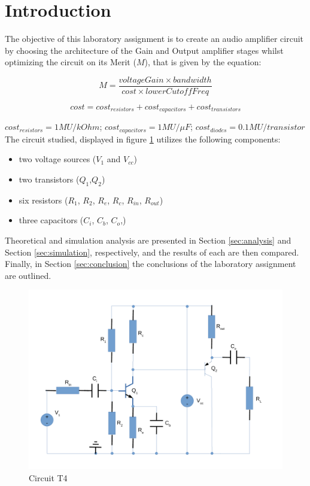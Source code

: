 
\section{Introduction}
\label{sec:introduction}



The objective of this laboratory assignment is to create an audio amplifier circuit by choosing the architecture of the Gain and Output amplifier stages whilst optimizing the circuit on its Merit ($M$), that is given by the equation:

\[
M = \frac{voltageGain\times bandwidth}{cost\times lowerCutoffFreq}
\]

\[
 cost = cost_{resistors} + cost_{capacitors} + cost_{transistors} 
\]

$cost_{resistors} = 1MU/kOhm$; $cost_{capacitors} = 1MU/\mu F$;
$cost_{diodes} = 0.1MU/transistor$ \\

The circuit studied, displayed in figure \ref{fig:Desenho_t4} utilizes the following components:

\begin{itemize}
	\item two voltage sources ($V_1$ and $V_{cc}$)
	\item two transistors ($Q_1$,$Q_2$)
	\item six resistors ($R_1$, $R_2$, $R_e$, $R_c$, $R_{in}$, $R_{out}$)
	\item three capacitors ($C_i$, $C_b$, $C_o$,)
\end{itemize}


Theoretical and simulation analysis are presented in Section \ref{sec:analysis} and Section \ref{sec:simulation}, respectively, and the results of each are then compared.
Finally, in Section \ref{sec:conclusion} the conclusions of the laboratory assignment are outlined. 



\begin{figure}[ht]
	\centering
	\includegraphics[width=0.85\linewidth]{dsnh_t4.pdf}
	\caption{Circuit T4}
\label{fig:Desenho_t4}
\end{figure}


